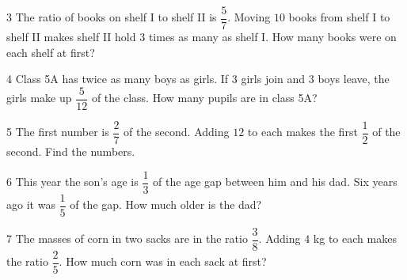 \gap
\begin{probbox}{3}{\relax}
The ratio of books on shelf I to shelf II is $\dfrac57$. Moving $10$ books from shelf I to shelf II makes shelf II hold $3$ times as many as shelf I. How many books were on each shelf at first?
\end{probbox}
\gap
\begin{probbox}{4}{\relax}
Class 5A has twice as many boys as girls. If $3$ girls join and $3$ boys leave, the girls make up $\dfrac5{12}$ of the class. How many pupils are in class 5A?
\end{probbox}
\gap
\begin{probbox}{5}{\relax}
The first number is $\dfrac27$ of the second. Adding $12$ to each makes the first $\dfrac12$ of the second. Find the numbers.
\end{probbox}
\gap
\begin{probbox}{6}{\relax}
This year the son's age is $\dfrac13$ of the age gap between him and his dad. Six years ago it was $\dfrac15$ of the gap. How much older is the dad?
\end{probbox}
\gap
\begin{probbox}{7}{\relax}
The masses of corn in two sacks are in the ratio $\dfrac38$. Adding $4$ kg to each makes the ratio $\dfrac25$. How much corn was in each sack at first?
\end{probbox}
